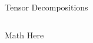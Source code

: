 \documentclass[handout]{beamer}
\begin{document}
\begin{frame}{Tensor Decompositions}
\begin{columns}
Math Here
\begin{figure}
  \centering
  \\
  \subfloat{
}
\end{figure}
\end{columns}
\end{frame}
\end{document}
